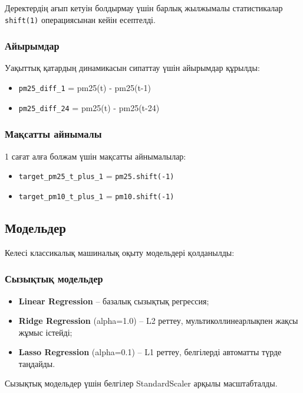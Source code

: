 \documentclass[12pt,a4paper]{article}
\begin{document}
Деректердің ағып кетуін болдырмау үшін барлық жылжымалы статистикалар \texttt{shift(1)} операциясынан кейін есептелді.

\subsubsection{Айырымдар}

Уақыттық қатардың динамикасын сипаттау үшін айырымдар құрылды:
\begin{itemize}
\item \texttt{pm25\_diff\_1} = pm25(t) - pm25(t-1)
\item \texttt{pm25\_diff\_24} = pm25(t) - pm25(t-24)
\end{itemize}

\subsubsection{Мақсатты айнымалы}

1 сағат алға болжам үшін мақсатты айнымалылар:
\begin{itemize}
\item \texttt{target\_pm25\_t\_plus\_1} = \texttt{pm25.shift(-1)}
\item \texttt{target\_pm10\_t\_plus\_1} = \texttt{pm10.shift(-1)}
\end{itemize}

\subsection{Модельдер}

Келесі классикалық машиналық оқыту модельдері қолданылды:

\subsubsection{Сызықтық модельдер}

\begin{itemize}
\item \textbf{Linear Regression} – базалық сызықтық регрессия;
\item \textbf{Ridge Regression} (alpha=1.0) – L2 реттеу, мультиколлинеарлықпен жақсы жұмыс істейді;
\item \textbf{Lasso Regression} (alpha=0.1) – L1 реттеу, белгілерді автоматты түрде таңдайды.
\end{itemize}

Сызықтық модельдер үшін белгілер StandardScaler арқылы масштабталды.
\end{document}
